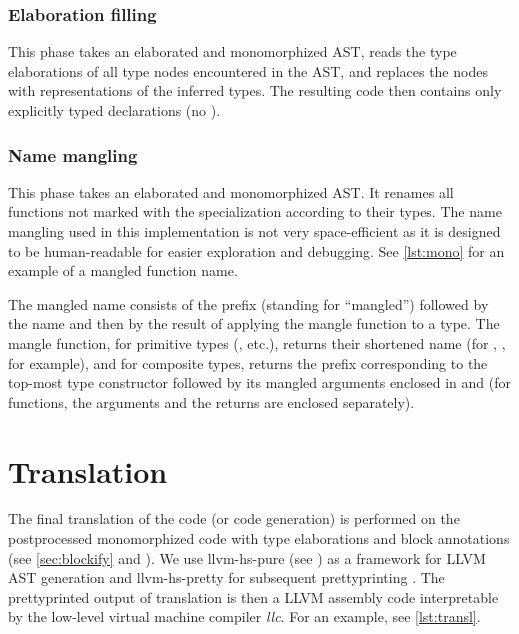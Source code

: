 \subsubsection{Elaboration filling}

This phase takes an elaborated and monomorphized AST, reads the type elaborations of all type nodes encountered in the AST, and replaces the nodes with representations of the inferred types. The resulting code then contains only explicitly typed declarations (no ).

\subsubsection{Name mangling}
\label{sec:mangling}

This phase takes an elaborated and monomorphized AST. It renames all functions not marked with the  specialization according to their types. The name mangling used in this implementation is not very space-efficient as it is designed to be human-readable for easier exploration and debugging. See \cref{lst:mono} for an example of a mangled function name.

\begin{defn}
    The mangled name consists of the  prefix (standing for ``mangled'') followed by the name and then by the result of applying the mangle function to a type. The mangle function, for primitive types (, etc.), returns their shortened name (for , , for example), and for composite types, returns the prefix corresponding to the top-most type constructor followed by its mangled arguments enclosed in  and  (for functions, the arguments and the returns are enclosed separately).
\end{defn}

\section{Translation}
\label{translation}

The final translation of the code (or code generation) is performed on the postprocessed monomorphized code with type elaborations and block annotations (see \cref{sec:blockify} and ). We use llvm-hs-pure (see \cite{llvmHSpure}) as a framework for LLVM AST generation and llvm-hs-pretty for subsequent prettyprinting \cite{llvmHSpretty}. The prettyprinted output of translation is then a LLVM assembly code interpretable by the low-level virtual machine compiler \emph{llc}. For an example, see \cref{lst:transl}.

